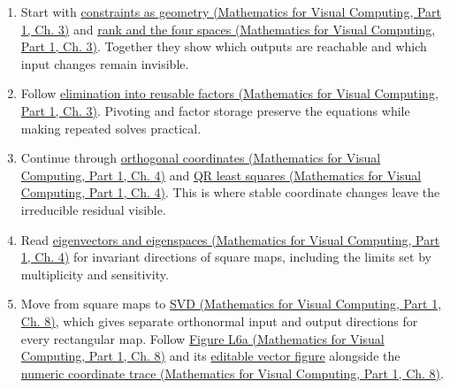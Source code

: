 \begin{enumerate}
\def\labelenumi{\arabic{enumi}.}
\tightlist
\item
  Start with \href{../02-Mathematics-for-Visual-Computing-P01/main.pdf\#nameddest=01-foundations-i-ch019-a-system-is-an-intersection-of-constraints}{constraints as geometry (Mathematics for Visual Computing, Part 1, Ch. 3)} and \href{../02-Mathematics-for-Visual-Computing-P01/main.pdf\#nameddest=01-foundations-i-ch019-rank-the-four-spaces-and-the-shape-of-the-answer}{rank and the four spaces (Mathematics for Visual Computing, Part 1, Ch. 3)}. Together they show which outputs are reachable and which input changes remain invisible.
\item
  Follow \href{../02-Mathematics-for-Visual-Computing-P01/main.pdf\#nameddest=01-foundations-i-ch019-elimination-multipliers-become-stored-factor-data}{elimination into reusable factors (Mathematics for Visual Computing, Part 1, Ch. 3)}. Pivoting and factor storage preserve the equations while making repeated solves practical.
\item
  Continue through \href{../02-Mathematics-for-Visual-Computing-P01/main.pdf\#nameddest=01-foundations-i-ch020-orthogonal-coordinates-preserve-the-shape-of-the-problem}{orthogonal coordinates (Mathematics for Visual Computing, Part 1, Ch. 4)} and \href{../02-Mathematics-for-Visual-Computing-P01/main.pdf\#nameddest=01-foundations-i-ch020-qr-turns-least-squares-into-a-triangular-solve-plus-an-irreducible-residual}{QR least squares (Mathematics for Visual Computing, Part 1, Ch. 4)}. This is where stable coordinate changes leave the irreducible residual visible.
\item
  Read \href{../02-Mathematics-for-Visual-Computing-P01/main.pdf\#nameddest=01-foundations-i-ch020-eigenvalues-eigenspaces-and-the-two-kinds-of-multiplicity}{eigenvectors and eigenspaces (Mathematics for Visual Computing, Part 1, Ch. 4)} for invariant directions of square maps, including the limits set by multiplicity and sensitivity.
\item
  Move from square maps to \href{../02-Mathematics-for-Visual-Computing-P01/main.pdf\#nameddest=02-foundations-ii-ch024-the-svd-equation-as-independent-input-output-channels}{SVD (Mathematics for Visual Computing, Part 1, Ch. 8)}, which gives separate orthonormal input and output directions for every rectangular map. Follow \href{../02-Mathematics-for-Visual-Computing-P01/main.pdf\#nameddest=02-foundations-ii-ch024-figure-l6a---watch-the-same-directions-become-an-ellipse}{Figure L6a (Mathematics for Visual Computing, Part 1, Ch. 8)} and its \href{../current/Assets/Print/3491f9bdb1d7f300619c0d11a33ded7f3b3adfdc803929f353124f6903c784b4.svg}{editable vector figure} alongside the \href{../02-Mathematics-for-Visual-Computing-P01/main.pdf\#nameddest=02-foundations-ii-ch024-a-concrete-rotation-stretch-and-coordinate-trace}{numeric coordinate trace (Mathematics for Visual Computing, Part 1, Ch. 8)}.

\end{enumerate}
